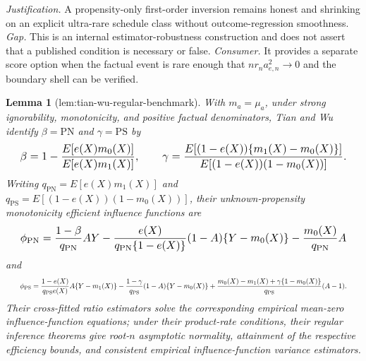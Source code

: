 \documentclass{article}
\newtheorem{lemma}{Lemma}
\begin{document}
\par\smallskip\noindent \textit{Justification.} A propensity-only first-order inversion remains honest and shrinking on an explicit ultra-rare schedule class without outcome-regression smoothness. \textit{Gap.} This is an internal estimator-robustness construction and does not assert that a published condition is necessary or false. \textit{Consumer.} It provides a separate score option when the factual event is rare enough that \(nr_na_{e,n}^2\to0\) and the boundary shell can be verified.

\begin{lemma}[lem:tian-wu-regular-benchmark]\label{lem:tian-wu-regular-benchmark}
With \(m_a=\mu_a\), under strong ignorability, monotonicity, and positive factual denominators, Tian and Wu identify \(\beta=\mathrm{PN}\) and \(\gamma=\mathrm{PS}\) by \[
\makebox[\linewidth][c]{\resizebox{0.98\linewidth}{!}{\par\noindent \makebox[\linewidth][c]{\resizebox{0.98\linewidth}{!}{\(\displaystyle \displaystyle \beta=1-\frac{E[e(X)m_0(X)]}{E[e(X)m_1(X)]},\qquad \gamma=\frac{E[(1-e(X))\{m_1(X)-m_0(X)\}]}{E[(1-e(X))(1-m_0(X))]}.\)}}\par\noindent}}
\] Writing \(q_{\mathrm{PN}}=E[e(X)m_1(X)]\) and \(q_{\mathrm{PS}}=E[(1-e(X))(1-m_0(X))]\), their unknown-propensity monotonicity efficient influence functions are \[
\makebox[\linewidth][c]{\resizebox{0.98\linewidth}{!}{\par\noindent \makebox[\linewidth][c]{\resizebox{0.98\linewidth}{!}{\(\displaystyle \displaystyle \phi_{\mathrm{PN}}=\frac{1-\beta}{q_{\mathrm{PN}}}AY-\frac{e(X)}{q_{\mathrm{PN}}\{1-e(X)\}}(1-A)\{Y-m_0(X)\}-\frac{m_0(X)}{q_{\mathrm{PN}}}A\)}}\par\noindent}}
\] and \[
\makebox[\linewidth][c]{\resizebox{0.98\linewidth}{!}{\par\noindent \makebox[\linewidth][c]{\resizebox{0.98\linewidth}{!}{\(\displaystyle \displaystyle \phi_{\mathrm{PS}}=\frac{1-e(X)}{q_{\mathrm{PS}}e(X)}A\{Y-m_1(X)\}-\frac{1-\gamma}{q_{\mathrm{PS}}}(1-A)\{Y-m_0(X)\}+\frac{m_0(X)-m_1(X)+\gamma\{1-m_0(X)\}}{q_{\mathrm{PS}}}(A-1).\)}}\par\noindent}}
\] Their cross-fitted ratio estimators solve the corresponding empirical mean-zero influence-function equations; under their product-rate conditions, their regular inference theorems give root-\(n\) asymptotic normality, attainment of the respective efficiency bounds, and consistent empirical influence-function variance estimators.
\end{lemma}
\end{document}
